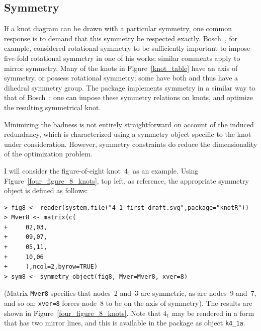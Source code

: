 \documentclass{birkjour}
\theoremstyle{definition}
\theoremstyle{remark}
\numberwithin{equation}{section}
\begin{document}
\subsection{Symmetry}

If a knot diagram can be drawn with a particular symmetry, one common
response is to demand that this symmetry be respected exactly.
Bosch~\cite{bosch2010}, for example, considered rotational symmetry to
be sufficiently important to impose five-fold rotational symmetry in
one of his works; similar comments apply to mirror symmetry.  Many of
the knots in Figure~\ref{knot_table} have an axis of symmetry, or
possess rotational symmetry; some have both and thus have a dihedral
symmetry group.  The package implements symmetry in a similar way to
that of Bosch~\cite{bosch2010}: one can impose these symmetry
relations on knots, and optimize the resulting symmetrical knot.

Minimizing the badness is not entirely straightforward on account of
the induced redundancy, which is characterized using a symmetry object
specific to the knot under consideration.  However, symmetry
constraints do reduce the dimensionality of the optimization problem.

I will consider the figure-of-eight knot~$4_1$ as an example.  Using
Figure~\ref{four_figure_8_knots}, top left, as reference, the
appropriate symmetry object is defined as follows:

\begin{verbatim}
> fig8 <- reader(system.file("4_1_first_draft.svg",package="knotR"))
> Mver8 <- matrix(c(
+     02,03,
+     09,07,
+     05,11,
+     10,06
+     ),ncol=2,byrow=TRUE)
> sym8 <- symmetry_object(fig8, Mver=Mver8, xver=8)
\end{verbatim}

(Matrix {\tt Mver8} specifies that nodes~2 and~3 are symmetric, as are
nodes~9 and~7, and so on; {\tt xver=8} forces node~8 to be on the axis
of symmetry).  The results are shown in
Figure~\ref{four_figure_8_knots}.  Note that $4_1$ may be rendered in
a form that has two mirror lines, and this is available in the package
as object {\tt k4\_1a}.
\end{document}
